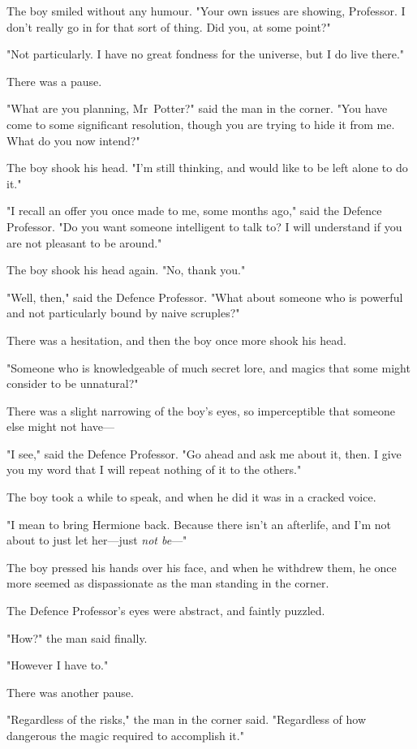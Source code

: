 The boy smiled without any humour. "Your own issues are showing, Professor. I
don't really go in for that sort of thing. Did you, at some point?"

"Not particularly. I have no great fondness for the universe, but I do live
there."

There was a pause.

"What are you planning, Mr~Potter?" said the man in the corner. "You have come
to some significant resolution, though you are trying to hide it from me. What
do you now intend?"

The boy shook his head. "I'm still thinking, and would like to be left alone to
do it."

"I recall an offer you once made to me, some months ago," said the Defence
Professor. "Do you want someone intelligent to talk to? I will understand if
you are not pleasant to be around."

The boy shook his head again. "No, thank you."

"Well, then," said the Defence Professor. "What about someone who is powerful
and not particularly bound by naive scruples?"

There was a hesitation, and then the boy once more shook his head.

"Someone who is knowledgeable of much secret lore, and magics that some might
consider to be unnatural?"

There was a slight narrowing of the boy's eyes, so imperceptible that someone
else might not have---

"I see," said the Defence Professor. "Go ahead and ask me about it, then. I
give you my word that I will repeat nothing of it to the others."

The boy took a while to speak, and when he did it was in a cracked voice.

"I mean to bring Hermione back. Because there isn't an afterlife, and I'm not
about to just let her---just \emph{not be}---"

The boy pressed his hands over his face, and when he withdrew them, he once
more seemed as dispassionate as the man standing in the corner.

The Defence Professor's eyes were abstract, and faintly puzzled.

"How?" the man said finally.

"However I have to."

There was another pause.

"Regardless of the risks," the man in the corner said. "Regardless of how
dangerous the magic required to accomplish it."

